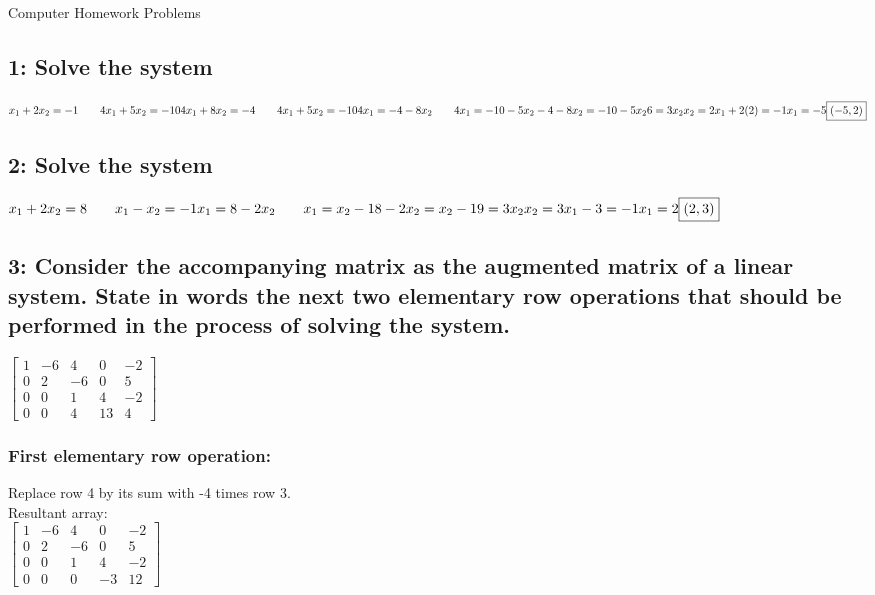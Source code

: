 \documentclass{article}
\begin{document}
\pagebreak

Computer Homework Problems

\subsection*{1: Solve the system}
$
x_1+2x_2=-1 \qquad 4x_1+5x_2=-10\\ [0.05in]
4x_1+8x_2=-4 \qquad 4x_1+5x_2=-10\\ [0.05in]
4x_1=-4-8x_2 \qquad 4x_1=-10-5x_2\\ [0.05in]
-4-8x_2=-10-5x_2\\
6=3x_2\\[0.05in]
x_2 = 2\\
x_1+2(2)=-1\\
x_1=-5\\
\boxed{(-5,2)}
$
\subsection*{2: Solve the system}
$
x_1+2x_2=8 \qquad x_1-x_2 = -1\\[0.05in]
x_1=8-2x_2 \qquad x_1 =x_2-1\\[0.05in]
8-2x_2=x_2-1\\
9=3x_2\\ 
x_2 = 3\\ 
x_1-3=-1\\ 
x_1 = 2\\ 
\boxed{(2,3)}
$
\subsection*{3: Consider the accompanying matrix as the augmented matrix of a linear system. State in words the next two elementary row operations that should be performed in the process of solving the system.}
$\left[\begin{array}{cccc|c}
1 & -6 & 4 & 0 & -2 \\
0 & 2 & -6 & 0 & 5 \\ 
0 & 0 & 1 & 4 & -2 \\ 
0 & 0 & 4 & 13 & 4
\end{array}\right] 
$
\subsubsection*{First elementary row operation:}
Replace row 4 by its sum with -4 times row 3.\\ Resultant array: \\
$\left[\begin{array}{cccc|c}
1 & -6 & 4 & 0 & -2 \\
0 & 2 & -6 & 0 & 5 \\ 
0 & 0 & 1 & 4 & -2 \\ 
0 & 0 & 0 & -3 & 12
\end{array}\right] 
$
\end{document}
